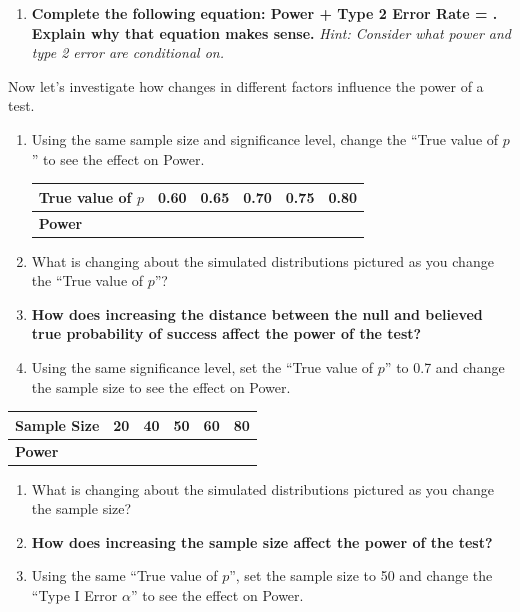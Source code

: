 \documentclass[
]{report}
\providecommand{\tightlist}{%
  \setlength{\itemsep}{0pt}\setlength{\parskip}{0pt}}
\begin{document}
\begin{enumerate}
\def\labelenumi{\arabic{enumi}.}
\setcounter{enumi}{8}
\tightlist
\item
  \textbf{Complete the following equation: Power + Type 2 Error Rate = . Explain why that equation makes sense.} \emph{Hint: Consider what power and type 2 error are conditional on.}
  \vspace{0.8in}
\end{enumerate}

Now let's investigate how changes in different factors influence the power of a test.

\begin{enumerate}
\def\labelenumi{\arabic{enumi}.}
\setcounter{enumi}{9}
\item
  Using the same sample size and significance level, change the ``True value of \(p\)'' to see the effect on Power.
  \setlength\tabcolsep{0.5cm}

  \begin{longtable}{|l|c|c|c|c|c|}
  \hline
  \textbf{True value of $p$}& 0.60 & 0.65 & 0.70 & 0.75 & 0.80 \\ \hline
  \textbf{Power} & & & & &  \\ \hline
  \end{longtable}
\item
  What is changing about the simulated distributions pictured as you change the ``True value of \(p\)''?
  \vspace{0.5in}
\item
  \textbf{How does increasing the distance between the null and believed true probability of success affect the power of the test?}
  \vspace{0.5in}
\item
  Using the same significance level, set the ``True value of \(p\)'' to 0.7 and change the sample size to see the effect on Power.
\end{enumerate}

\setlength\tabcolsep{0.6cm}
\begin{longtable}{|l|c|c|c|c|c|}
\hline
\textbf{Sample Size}& 20 & 40 & 50 & 60 & 80 \\ \hline
\textbf{Power} & & & & &  \\ \hline
\end{longtable}

\begin{enumerate}
\def\labelenumi{\arabic{enumi}.}
\setcounter{enumi}{13}
\item
  What is changing about the simulated distributions pictured as you change the sample size?
  \vspace{0.5in}
\item
  \textbf{How does increasing the sample size affect the power of the test?}
  \vspace{0.5in}
\item
  Using the same ``True value of \(p\)'', set the sample size to 50 and change the ``Type I Error \(\alpha\)'' to see the effect on Power.
\end{enumerate}
\end{document}
